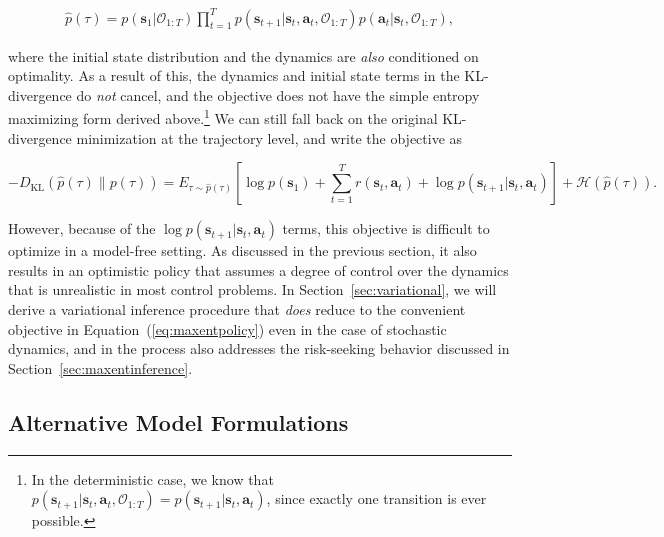 \begin{align}
\hat{p}(\tau) = p(\mathbf{s}_1 | \mathcal{O}_{1:T}) \prod_{t=1}^T p(\mathbf{s}_{t+1}|\mathbf{s}_t,\mathbf{a}_t, \mathcal{O}_{1:T}) p(\mathbf{a}_t|\mathbf{s}_t, \mathcal{O}_{1:T}),
\end{align}

where the initial state distribution and the dynamics are \emph{also} conditioned on optimality. As a result of this, the dynamics and initial state terms in the KL-divergence do \emph{not} cancel, and the objective does not have the simple entropy maximizing form derived above.\footnote{In the deterministic case, we know that $p(\mathbf{s}_{t+1}|\mathbf{s}_t,\mathbf{a}_t, \mathcal{O}_{1:T}) = p(\mathbf{s}_{t+1}|\mathbf{s}_t,\mathbf{a}_t)$, since exactly one transition is ever possible.} We can still fall back on the original KL-divergence minimization at the trajectory level, and write the objective as

\begin{equation}
-D_\text{KL}(\hat{p}(\tau) \| p(\tau)) = E_{\tau \sim \hat{p}(\tau)}\left[ \log p(\mathbf{s}_1) + \sum_{t=1}^T r(\mathbf{s}_t,\mathbf{a}_t) + \log p(\mathbf{s}_{t+1} |\mathbf{s}_t,\mathbf{a}_t) \right] + \mathcal{H}(\hat{p}(\tau)). \label{eq:maxentstochdynamics}
\end{equation}

However, because of the $\log p(\mathbf{s}_{t+1} |\mathbf{s}_t,\mathbf{a}_t)$ terms, this objective is difficult to optimize in a model-free setting. As discussed in the previous section, it also results in an optimistic policy that assumes a degree of control over the dynamics that is unrealistic in most control problems. In Section~\ref{sec:variational}, we will derive a variational inference procedure that \emph{does} reduce to the convenient objective in Equation~(\ref{eq:maxentpolicy}) even in the case of stochastic dynamics, and in the process also addresses the risk-seeking behavior discussed in Section~\ref{sec:maxentinference}.

\subsection{Alternative Model Formulations}
\label{sec:alt_model}

